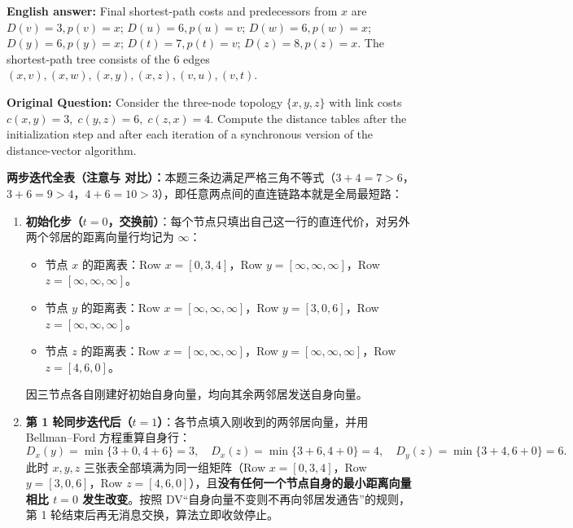 \textbf{English answer:} Final shortest-path costs and predecessors from $x$ are $D(v)=3,p(v)=x$; $D(u)=6,p(u)=v$; $D(w)=6,p(w)=x$; $D(y)=6,p(y)=x$; $D(t)=7,p(t)=v$; $D(z)=8,p(z)=x$. The shortest-path tree consists of the 6 edges $(x,v),(x,w),(x,y),(x,z),(v,u),(v,t)$.



\textbf{Original Question:} Consider the three-node topology $\{x, y, z\}$ with link costs $c(x,y) = 3,\; c(y,z) = 6,\; c(z,x) = 4$. Compute the distance tables after the initialization step and after each iteration of a synchronous version of the distance-vector algorithm.

\textbf{两步迭代全表（注意与  对比）：}本题三条边满足严格三角不等式（$3+4=7 > 6$，$3+6=9 > 4$，$4+6=10 > 3$），即任意两点间的直连链路本就是全局最短路：
\begin{enumerate}
\item \textbf{初始化步（$t = 0$，交换前）}：每个节点只填出自己这一行的直连代价，对另外两个邻居的距离向量行均记为 $\infty$：
  \begin{itemize}
  \item 节点 $x$ 的距离表：Row $x = [0, 3, 4]$，Row $y = [\infty, \infty, \infty]$，Row $z = [\infty, \infty, \infty]$。
  \item 节点 $y$ 的距离表：Row $x = [\infty, \infty, \infty]$，Row $y = [3, 0, 6]$，Row $z = [\infty, \infty, \infty]$。
  \item 节点 $z$ 的距离表：Row $x = [\infty, \infty, \infty]$，Row $y = [\infty, \infty, \infty]$，Row $z = [4, 6, 0]$。
  \end{itemize}
  因三节点各自刚建好初始自身向量，均向其余两邻居发送自身向量。
\item \textbf{第 1 轮同步迭代后（$t = 1$）}：各节点填入刚收到的两邻居向量，并用 Bellman–Ford 方程重算自身行：
\[
D_x(y)=\min\{3+0, 4+6\}=3,\quad D_x(z)=\min\{3+6, 4+0\}=4,\quad D_y(z)=\min\{3+4, 6+0\}=6.
\tag{T9.1}
\]
此时 $x, y, z$ 三张表全部填满为同一组矩阵（Row $x=[0,3,4]$，Row $y=[3,0,6]$，Row $z=[4,6,0]$），且\textbf{没有任何一个节点自身的最小距离向量相比 $t=0$ 发生改变}。按照 DV“自身向量不变则不再向邻居发通告”的规则，第 1 轮结束后再无消息交换，算法立即收敛停止。
\end{enumerate}

